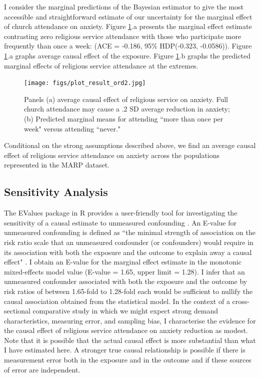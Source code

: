 \documentclass[]{interact}
\theoremstyle{plain}%
\theoremstyle{definition}
\theoremstyle{remark}
\begin{document}
I consider the marginal predictions of the Bayesian estimator to give the most accessible and straightforward estimate of our uncertainty for the marginal effect of church attendance on anxiety. Figure \ref{fig:Figure2}.a presents the marginal effect estimate contrasting zero religious service attendance with those who participate more frequently than once a week: (ACE = -0.186, 95\% HDP(-0.323, -0.0586)). Figure \ref{fig:Figure2}.a graphs average causal effect of the exposure. Figure \ref{fig:Figure2}.b graphs the predicted marginal effects of religious service attendance at the extremes.

\begin{figure}
\centering
    \caption{Panels (a) average causal effect of religious service on anxiety. Full church attendance may cause a .2 SD average reduction in anxiety; (b) Predicted marginal means for attending “more than once per week" versus attending “never."}
    \texttt{[image: figs/plot\_result\_ord2.jpg]}
    \label{fig:Figure2}
\end{figure}

Conditional on the strong assumptions described above, we find an average causal effect of religious service attendance on anxiety across the populations represented in the MARP dataset. 

\subsection{Sensitivity Analysis}

The EValues package in R provides a user-friendly tool for investigating the sensitivity of a causal estimate to unmeasured confounding \citep{vanderweele_sensitivity_2017, mathur_website_2018,r_core_team_r_2021}.
An E-value for unmeasured confounding is defined as ``the minimal strength of association on the risk ratio scale that an unmeasured confounder (or confounders) would require in its association with both the exposure and the outcome to explain away a causal effect" \citep{mathur_website_2018}. 
I obtain an E-value for the marginal effect estimate in the monotonic mixed-effects model value (E-value = 1.65, upper limit = 1.28). I infer that an unmeasured confounder associated with both the exposure and the outcome by risk ratios of between 1.65-fold to 1.28-fold each would be sufficient to nullify the causal association obtained from the statistical model. In the context of a cross-sectional comparative study in which we might expect strong demand characteristics, measuring error, and sampling bias, I characterise the evidence for the causal effect of religious service attendance on anxiety reduction as modest. Note that it is possible that the actual causal effect is more substantial than what I have estimated here. A stronger true causal relationship is possible if there is measurement error both in the exposure and in the outcome and if these sources of error are independent. 
\end{document}

